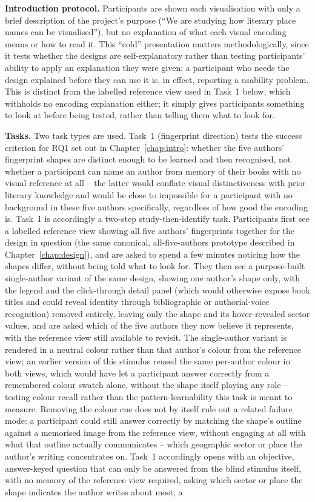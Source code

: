 \documentclass[logo,msc]{infthesis}
\begin{document}
\textbf{Introduction protocol.} Participants are shown each visualisation with only a brief description of the project's purpose (``We are studying how literary place names can be visualised''), but no explanation of what each visual encoding means or how to read it. This ``cold'' presentation matters methodologically, since it tests whether the designs are self-explanatory rather than testing participants' ability to apply an explanation they were given: a participant who needs the design explained before they can use it is, in effect, reporting a usability problem. This is distinct from the labelled reference view used in Task~1 below, which withholds no encoding explanation either; it simply gives participants something to look at before being tested, rather than telling them what to look for.
 
\textbf{Tasks.} Two task types are used. Task~1 (fingerprint direction) tests the success criterion for RQ1 set out in Chapter~\ref{chap:intro}: whether the five authors' fingerprint shapes are distinct enough to be learned and then recognised, not whether a participant can name an author from memory of their books with no visual reference at all -- the latter would conflate visual distinctiveness with prior literary knowledge and would be close to impossible for a participant with no background in these five authors specifically, regardless of how good the encoding is. Task~1 is accordingly a two-step study-then-identify task. Participants first see a labelled reference view showing all five authors' fingerprints together for the design in question (the same canonical, all-five-authors prototype described in Chapter~\ref{chap:design}), and are asked to spend a few minutes noticing how the shapes differ, without being told what to look for. They then see a purpose-built single-author variant of the same design, showing one author's shape only, with the legend and the click-through detail panel (which would otherwise expose book titles and could reveal identity through bibliographic or authorial-voice recognition) removed entirely, leaving only the shape and its hover-revealed sector values, and are asked which of the five authors they now believe it represents, with the reference view still available to revisit. The single-author variant is rendered in a neutral colour rather than that author's colour from the reference view; an earlier version of this stimulus reused the same per-author colour in both views, which would have let a participant answer correctly from a remembered colour swatch alone, without the shape itself playing any role -- testing colour recall rather than the pattern-learnability this task is meant to measure. Removing the colour cue does not by itself rule out a related failure mode: a participant could still answer correctly by matching the shape's outline against a memorised image from the reference view, without engaging at all with what that outline actually communicates -- which geographic sector or place the author's writing concentrates on. Task~1 accordingly opens with an objective, answer-keyed question that can only be answered from the blind stimulus itself, with no memory of the reference view required, asking which sector or place the shape indicates the author writes about most; a 
\end{document}
